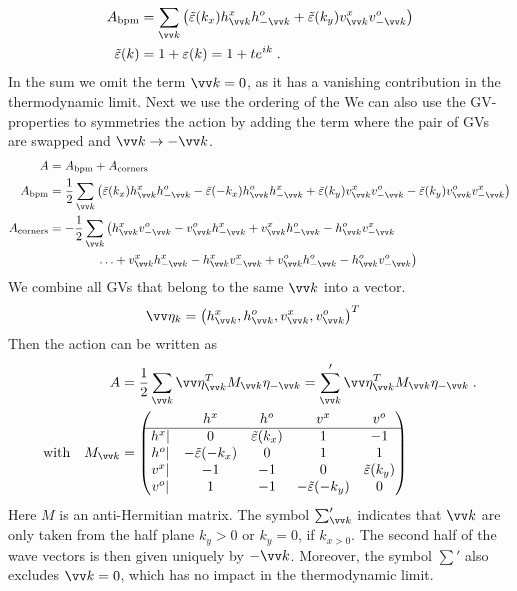 %
\begin{align*}
A_\text{bpm} &= \sum_{\vv k} \big(\tilde \varepsilon(k_{x}) \hdag{\vv k} \hnag{-\vv k}
+ \tilde \varepsilon(k_{y}) \vdag{\vv k} \vnag{-\vv k}\big)\\
\tilde \varepsilon(k) &= 1+\varepsilon(k)
=1 + t e^{i k} \;.
\end{align*}
%
In the sum we omit the term $\vv k=0$, as it has a vanishing contribution in the thermodynamic limit.
Next we use the ordering of the 
We can also use the GV-properties to symmetries the action by adding the term where the pair of GVs are swapped and $\vv k \to -\vv k$.
%
\begin{align*}
A &= A_\text{bpm}  + A_\text{corners}\\
A_\text{bpm} &=\frac{1}{2}\sum_{\vv k} \big(\tilde \varepsilon(k_{x}) \hdag{\vv k} \hnag{-\vv k}
-\tilde \varepsilon(-k_{x}) \hnag{\vv k} \hdag{-\vv k} 
+ \tilde \varepsilon(k_{y}) \vdag{\vv k} \vnag{-\vv k}
- \tilde \varepsilon(k_{y}) \vnag{\vv k} \vdag{-\vv k} 
\big)\\
A_\text{corners} &=  -\frac{1}{2}\sum_{\vv k} \big(
\hdag{\vv k} \vnag{-\vv k}
-\vnag{\vv k} \hdag{-\vv k} 
+\vdag{\vv k} \hnag{-\vv k}
- \hnag{\vv k}\vdag{-\vv k}\\
&\qquad\qquad     \ldots 
+\vdag{\vv k} \hdag{-\vv k} 
-\hdag{\vv k}  \vdag{-\vv k} 
+\vnag{\vv k} \hnag{-\vv k} 
- \hnag{\vv k} \vnag{-\vv k}\big)
\end{align*}
% 
We combine all GVs that belong to the same $\vv k$ into a vector.%
\begin{align*}
\vv \eta_{k} &= \big( \hdag{\vv k}, \hnag{\vv k}, \vdag{\vv k}, \vnag{\vv k}\big)^{T}
\end{align*}
%
Then the action can be written as
%
\begin{align*}
A &=  \frac{1}{2}\sum_{\vv k} \vv \eta_{\vv k}^{T}  M_{\vv k}  \eta_{-\vv k}
 =  \sum'_{\vv k} \vv \eta_{\vv k}^{T}  M_{\vv k}  \eta_{-\vv k}\;.\\
\text{with}\quad M_{\vv k} &=
\begin{pmatrix}
&h^{x}& h^{o}& v^{x} & v^{o}\\
\hline
h^{x}|&	0 & \tilde \varepsilon(k_{x}) & 1 & -1\\
h^{o}|&	-\tilde \varepsilon(-k_{x}) & 0  & 1 & 1\\
v^{x}|&	-1 & -1 & 0 & \tilde \varepsilon(k_{y})\\
v^{o}|&	1 & -1 & -\tilde \varepsilon(-k_{y}) & 0
\end{pmatrix}
\end{align*}
%
Here $M$ is an anti-Hermitian  matrix. The symbol $\sum'_{\vv k}$ indicates that $\vv k $ are only taken from the half plane $k_{y} > 0$ or $k_{y}=0$, if $k_{x > 0}$. The second half of the wave vectors is then given uniquely by $-\vv k$.
Moreover, the symbol $\sum'$
also excludes  $\vv k =0$, which has no impact in the thermodynamic limit. 

